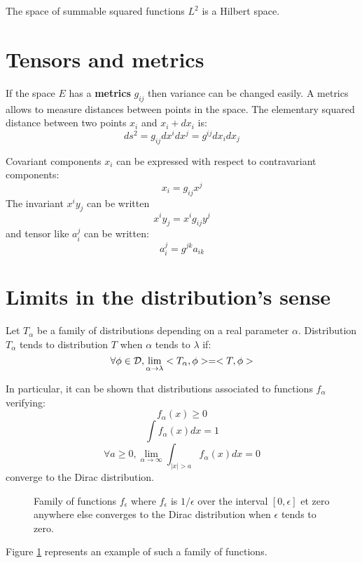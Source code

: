 \documentclass[12pt]{book}
\begin{document}
The space of summable squared functions $L^2$ is a Hilbert space.

\section{Tensors and metrics}
If the space $E$ has a {\bf metrics} $g_{ij}$ then variance can be changed
easily. A metrics allows to measure distances between points in the
space. The elementary squared distance between two points $x_i$ and
$x_i+dx_i$ is:
\begin{equation}
ds^2=g_{ij}dx^idx^j=g^{ij}dx_idx_j
\end{equation}

Covariant components $x_i$ can be expressed with respect to contravariant
components:
\begin{equation}
x_i=g_{ij}x^j
\end{equation}
The invariant $x^iy_j$ can be written
\begin{equation}
x^iy_j=x^ig_{ij}y^j
\end{equation}
and tensor like $a_i^j$ can be written:
\begin{equation}
a_i^j=g^{jk}a_{ik}
\end{equation}


\section{Limits in the distribution's sense}
\begin{defn}
Let $T_\alpha$  be a family of distributions depending on a real parameter
$\alpha$. Distribution $T_\alpha$ tends to distribution $T$ when $\alpha$ tends
to $\lambda$ if:
\begin{equation}
\forall \phi \in {\cal D},
\lim_{\alpha\rightarrow\lambda}<T_\alpha,\phi>=<T,\phi> 
\end{equation}
\end{defn}
In particular, it can be shown that distributions associated to functions $f_\alpha$ verifying:
\begin{equation}
f_\alpha(x)\geq 0
\end{equation}
\begin{equation}
\int f_\alpha(x)dx=1
\end{equation}
\begin{equation}
\forall a\geq 0,
\lim_{\alpha\rightarrow\infty}\int_{|x|>a}f_\alpha(x)dx=0 
\end{equation}
converge to the Dirac distribution.
\begin{figure}[htb]
 \centerline{}   
 \caption{Family of functions $f_\epsilon$ where $f_\epsilon$ is
$1/\epsilon$ over the interval $[0,\epsilon]$ et zero anywhere else converges
to the Dirac distribution when $\epsilon$ tends to zero.}
 \label{figdirac}
\end{figure}
Figure \ref{figdirac} represents an example of such a family of functions.
\end{document}
